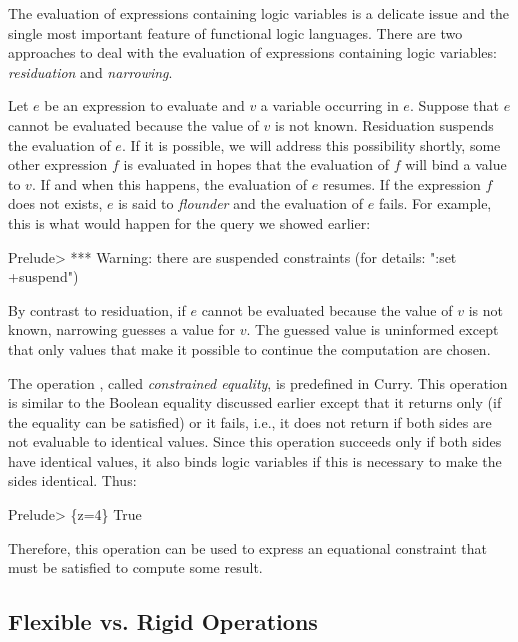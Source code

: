 The evaluation of expressions containing logic variables
is a delicate issue and the single most important feature
of functional logic languages.
There are two approaches to deal with the evaluation of
expressions containing logic variables:
\emph{residuation} and
\emph{narrowing}.

Let $e$ be an expression to evaluate and $v$ a variable
occurring in $e$.
Suppose that $e$ cannot be evaluated because the value of
$v$ is not known.
Residuation suspends the evaluation of $e$.
If it is possible, we will address this possibility shortly,
some other expression $f$ is evaluated in hopes that the evaluation
of $f$ will bind a value to $v$.  If and when this happens,
the evaluation of $e$ resumes.
If the expression $f$ does not exists, $e$ is said to
\emph{flounder} and the evaluation of $e$
fails.
For example, this is what would happen for the query we showed
earlier:
%
\begin{prog}
Prelude> 
*** Warning: there are suspended constraints (for details: ":set +suspend")
\end{prog}
%
By contrast to residuation, 
if $e$ cannot be evaluated because the value of $v$ is not known,
narrowing guesses a value for $v$.
The guessed value is uninformed except that only values that
make it possible to continue the computation are chosen.

The operation \ccode{=:=},
called \emph{constrained equality},
is predefined in Curry.
This operation is similar to the Boolean equality
discussed earlier except that it returns only 
(if the equality can be satisfied) or it fails,
i.e., it does not return  if both sides are not evaluable
to identical values.
Since this operation succeeds only if both sides have identical values,
it also binds logic variables if this is necessary to make the sides
identical.
Thus:
%
\begin{prog}
Prelude> 
\{z=4\} True
\end{prog}
%
Therefore, this operation can be used to express an
equational constraint that must be satisfied to compute some result.

\subsection{Flexible vs. Rigid Operations}

